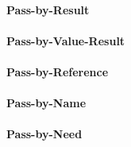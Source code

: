 \paragraph{Pass-by-Result}\label{par:Parameter_Passing-Pass_By_Result}
\paragraph{Pass-by-Value-Result}\label{par:Parameter_Passing-Pass_By_Value_Result}
\paragraph{Pass-by-Reference}\label{par:Parameter_Passing-Pass_By_Reference}
\paragraph{Pass-by-Name}\label{par:Parameter_Passing-Pass_By_Name}
\paragraph{Pass-by-Need}\label{par:Parameter_Passing-Pass_By_Need}

